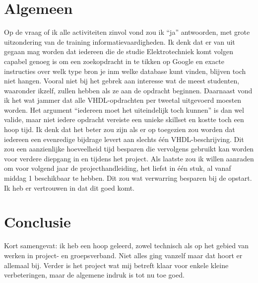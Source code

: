 \documentclass{article}
\begin{document}
\section*{Algemeen}

Op de vraag of ik alle activiteiten zinvol vond zou ik ``ja'' antwoorden, met grote uitzondering van de training informatievaardigheden. Ik denk dat er van uit gegaan mag worden dat iedereen die de studie Elektrotechniek komt volgen capabel genoeg is om een zoekopdracht in te tikken op Google en exacte instructies over welk type bron je inm welke database kunt vinden, blijven toch niet hangen. Vooral niet bij het gebrek aan interesse wat de meest studenten, waaronder ikzelf, zullen hebben als ze aan de opdracht beginnen.
Daarnaast vond ik het wat jammer dat alle VHDL-opdrachten per tweetal uitgevoerd moesten worden. Het argument ``iedereen moet het uiteindelijk toch kunnen'' is dan wel valide, maar niet iedere opdracht vereiste een unieke skillset en kostte toch een hoop tijd. Ik denk dat het beter zou zijn als er op toegezien zou worden dat iedereen een evenredige bijdrage levert aan slechts één VHDL-beschrijving. Dit zou een aanzienlijke hoeveelheid tijd besparen die vervolgens gebruikt kan worden voor verdere diepgang in en tijdens het project. Als laatste zou ik willen aanraden om voor volgend jaar de projecthandleiding, het liefst in één stuk, al vanaf middag 1 beschikbaar te hebben. Dit zou wat verwarring besparen bij de opstart. Ik heb er vertrouwen in dat dit goed komt.

\section*{Conclusie}

Kort samengevat: ik heb een hoop geleerd, zowel technisch als op het gebied van werken in project- en groepsverband. Niet alles ging vanzelf maar dat hoort er allemaal bij.
Verder is het project wat mij betreft klaar voor enkele kleine verbeteringen, maar de algemene indruk is tot nu toe goed.
\end{document}
